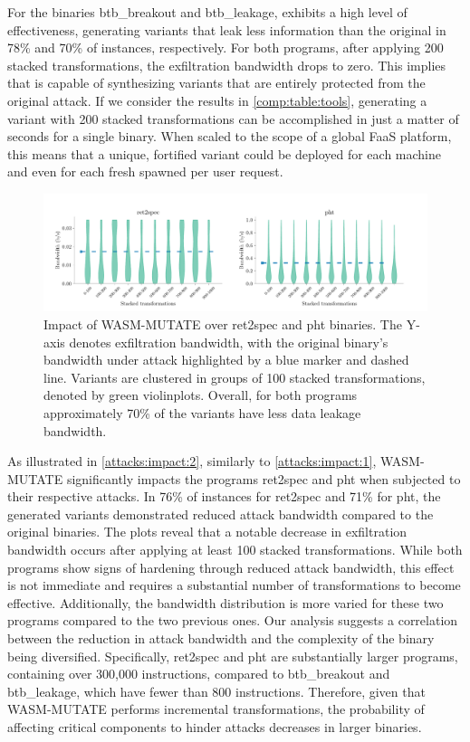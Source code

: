  For the binaries btb\_breakout and btb\_leakage, \tool exhibits a high level of effectiveness, generating variants that leak less information than the original in 78\% and 70\% of instances, respectively.
For both programs, after applying 200 stacked transformations, the exfiltration bandwidth drops to zero.
This implies that \tool is capable of synthesizing variants that are entirely protected from the original attack.
If we consider the results in \autoref{comp:table:tools}, generating a variant with 200 stacked transformations can be accomplished in just a matter of seconds for a single \wasm binary.
When scaled to the scope of a global FaaS platform, this means that a unique, fortified variant could be deployed for each machine and even for each fresh \Wasm spawned per user request.

\begin{figure}[h]
    \centering    
    \includegraphics[width=\linewidth]{plots/spectre/results.rq3.2.pdf}
    \caption{Impact of WASM-MUTATE over ret2spec and pht binaries. The Y-axis denotes exfiltration bandwidth, with the original binary's bandwidth under attack highlighted by a blue marker and dashed line. Variants are clustered in groups of 100 stacked transformations, denoted by green violinplots. 
    Overall, for both programs approximately 70\% of the variants have less data leakage bandwidth.}
  \label{attacks:impact:2}
\end{figure}


As illustrated in \autoref{attacks:impact:2}, similarly to \autoref{attacks:impact:1}, WASM-MUTATE significantly impacts the programs ret2spec and pht when subjected to their respective attacks. 
In 76\% of instances for ret2spec and 71\% for pht, the generated variants demonstrated reduced attack bandwidth compared to the original binaries.
The plots reveal that a notable decrease in exfiltration bandwidth occurs after applying at least 100 stacked transformations. 
While both programs show signs of hardening through reduced attack bandwidth, this effect is not immediate and requires a substantial number of transformations to become effective. 
Additionally, the bandwidth distribution is more varied for these two programs compared to the two previous ones.
Our analysis suggests a correlation between the reduction in attack bandwidth and the complexity of the binary being diversified. 
Specifically, ret2spec and pht are substantially larger programs, containing over 300,000 instructions, compared to btb\_breakout and btb\_leakage, which have fewer than 800 instructions. 
Therefore, given that WASM-MUTATE performs incremental transformations, the probability of affecting critical components to hinder attacks decreases in larger binaries.

